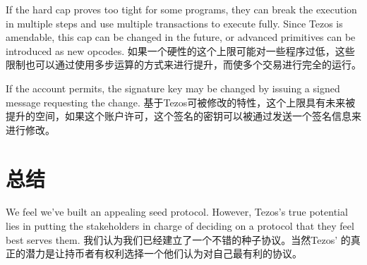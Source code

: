 \documentclass[letterpaper]{article}
\begin{document}
If the hard cap proves too tight for some programs, they can break the execution
in multiple steps and use multiple transactions to execute fully. Since Tezos is
amendable, this cap can be changed in the future, or advanced primitives can be
introduced as new opcodes.
如果一个硬性的这个上限可能对一些程序过低，这些限制也可以通过使用多步运算的方式来进行提升，而使多个交易进行完全的运行。

If the account permits, the signature key may be changed by issuing a signed
message requesting the change.
基于Tezos可被修改的特性，这个上限具有未来被提升的空间，如果这个账户许可，这个签名的密钥可以被通过发送一个签名信息来进行修改。

\section{总结}
We feel we've built an appealing seed protocol. However, Tezos's true potential
lies in putting the stakeholders in charge of deciding on a protocol that they
feel best serves them.
我们认为我们已经建立了一个不错的种子协议。当然Tezos’ 的真正的潜力是让持币者有权利选择一个他们认为对自己最有利的协议。



\end{document}

